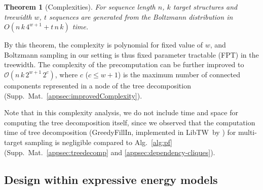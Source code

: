 \documentclass[]{bmcart}
\newtheorem{theorem}{Theorem}
\newcommand{\Software}[1]{{\ttfamily #1}}
\newcommand{\citet}[1]{\cite{#1}}
\begin{document}


\begin{theorem}[Complexities]\label{th:complexities}
  For sequence length $n$, $k$ target structures and treewidth $w$,
  $t$ sequences
  are generated from the Boltzmann distribution  in
  $O( n\, k \, 4^{w+1} + t\, n\, k )$ time.
\end{theorem}

By this theorem, the complexity is polynomial for fixed value of $w$, and Boltzmann sampling in our setting is thus fixed parameter tractable (FPT) in the treewidth.
%
The complexity of the precomputation can be further improved to
$\mathcal{O}(n\,k\,2^{w+1}\,2^{c})$, where $c$ ($c\le w+1$) is the maximum number of connected components represented in a node of the tree decomposition (Supp.\ Mat.~\ref{appsec:improvedComplexity}).


Note that in this complexity analysis, we do not include time and space for computing the
tree decomposition itself, since we observed that the computation time
of tree decomposition (\Software{GreedyFillIn}, implemented in
\Software{LibTW}~by \citet{Dijk2006}) for multi-target sampling is
negligible compared to Alg.~\ref{alg:pf}
(Supp.\ Mat.~\ref{appsec:treedecomp} and
\ref{appsec:dependency-cliques}).

\subsection*{Design within expressive energy models}\label{sec:energy_models}

\end{document}
